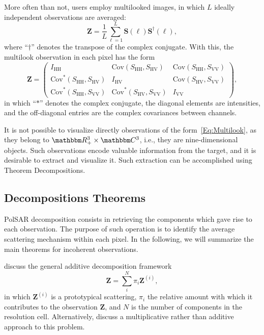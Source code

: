 \documentclass{article}
\begin{document}
More often than not, users employ multilooked images, in which $L$ ideally independent observations are averaged:
\begin{equation}
\bm Z = \frac{1}{L} \sum_{\ell=1}^L \bm S(\ell) \bm S^\dag(\ell),
\end{equation}
where ``$\dag$'' denotes the transpose of the complex conjugate.
With this, the multilook observation in each pixel has the form
\begin{equation}
\bm Z = \begin{pmatrix}
I_{\text{HH}} & \text{Cov}(S_{\text{HH}},S_\text{HV}) & \text{Cov}(S_{\text{HH}},S_\text{VV}) \\
\text{Cov}^*(S_{\text{HH}},S_\text{HV}) & I_{\text{HV}} & \text{Cov}(S_{\text{HV}},S_\text{VV})\\
\text{Cov}^*(S_{\text{HH}},S_\text{VV}) & \text{Cov}^*(S_{\text{HV}},S_\text{VV}) & I_{\text{VV}}
\end{pmatrix},
\label{Eq:Multilook}
\end{equation}
in which ``$*$'' denotes the complex conjugate, the diagonal elements are intensities, and the off-diagonal entries are the complex covariances between channels.

It is not possible to visualize directly observations of the form~\eqref{Eq:Multilook}, as they belong to $\mathbbm R_+^3\times \mathbbm C^3$, i.e., they are nine-dimensional objects.
Such observations encode valuable information from the target, and it is desirable to extract and visualize it.
Such extraction can be accomplished using Theorem Decompositions.

\subsection{Decompositions Theorems}

PolSAR decomposition consists in retrieving the components which gave rise to each observation.
The purpose of such operation is to identify the average scattering mechanism within each pixel.
In the following, we will summarize the main theorems for incoherent observations.

\citet{ModelingandInterpretationofScatteringMechanismsinPolarimetricSyntheticApertureRadarAdvancesandPerspectives2014} discuss the general additive decomposition framework
\begin{equation}
\bm Z = \sum_i^N \pi_i \bm Z^{(i)},
\end{equation}
in which $\bm Z^{(i)}$ is a prototypical scattering, 
$\pi_i$ the relative amount with which it contributes to the observation $\bm Z$, and $N$ is the number of components in the resolution cell.
Alternatively, \citet{APolSARScatteringPowerFactorizationFrameworkandNovelRollInvariantParametersBasedUnsupervisedClassificationSchemeUsingaGeodesicDistanceinpress} discuss a multiplicative rather than additive approach to this problem.
\end{document}
